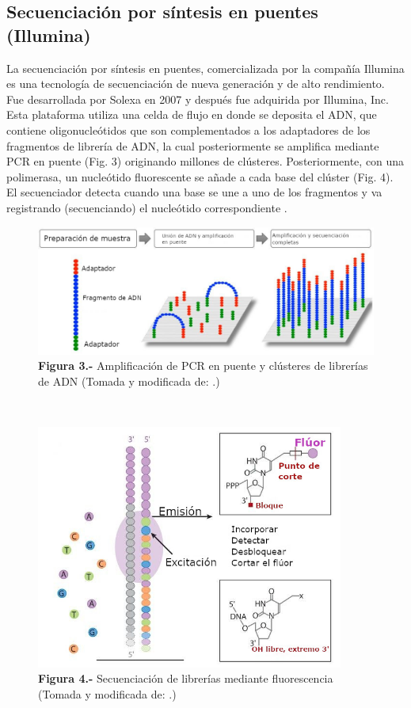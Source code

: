 \documentclass[12pt,letterpaper,oneside]{report}
\begin{document}
\subsection{Secuenciación por síntesis en puentes (Illumina)}
La secuenciación por síntesis en puentes, comercializada por la compañía Illumina es una tecnología de secuenciación de nueva generación y de alto rendimiento. Fue desarrollada por Solexa en 2007 y después fue adquirida por Illumina, Inc. Esta plataforma utiliza una celda de flujo en donde se deposita el ADN, que contiene oligonucleótidos que son complementados a los adaptadores de los fragmentos de librería de ADN, la cual posteriormente se amplifica mediante PCR en puente (Fig. 3) originando millones de clústeres. Posteriormente, con una polimerasa, un nucleótido fluorescente se añade a cada base del clúster (Fig. 4). El secuenciador detecta cuando una base se une a uno de los fragmentos y va registrando (secuenciando) el nucleótido correspondiente \autocite{Garrido-Cardenas2017,Mardis2013}.
\begin{figure}[!h]
\centering
\includegraphics[width=14.1cm]{figuras/IMG_3}
\caption*{\textbf{Figura 3.-} Amplificación de PCR en puente y clústeres de librerías de ADN (Tomada y modificada de: \cite{Garrido-Cardenas2017}.)}
\label{Figura 3}
\end{figure}
\\[30cm]
\begin{figure}[!h]
\centering
\includegraphics[width=10.11cm]{figuras/IMG_4}
\caption*{\textbf{Figura 4.-} Secuenciación de librerías mediante fluorescencia (Tomada y modificada de: \cite{Mardis2013}.)}
\label{Figura 4}
\end{figure}
\end{document}
